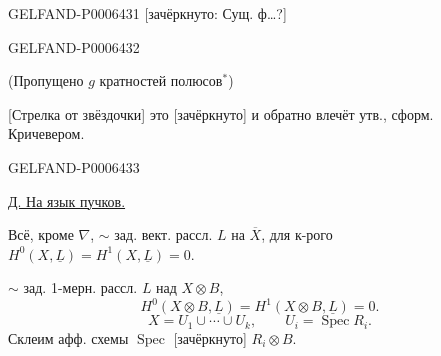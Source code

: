\begin{GelfandAdjacentEvidence}{GELFAND-P000643}{1}
[зачёркнуто: Сущ. ф…?]
\end{GelfandAdjacentEvidence}
\begin{GelfandAdjacentEvidence}{GELFAND-P000643}{2}

(Пропущено \(g\) кратностей полюсов\({}^*\))

[Стрелка от звёздочки] это [зачёркнуто] и обратно влечёт утв., сформ. Кричевером.
\end{GelfandAdjacentEvidence}
\begin{GelfandAdjacentEvidence}{GELFAND-P000643}{3}


\underline{Д. На язык пучков.}

Всё, кроме \(\nabla\), \(\sim\) зад. вект. рассл. \(L\) на \(\overline X\),
для к-рого \(H^0(X,\underline L)=H^1(X,\underline L)=0\).

\(\sim\) зад. 1-мерн. рассл. \(L\) над \(X\otimes B\),
\[
H^0(X\otimes B,\underline L)=H^1(X\otimes B,\underline L)=0.
\]
\[
X=U_1\cup\cdots\cup U_k,\qquad U_i=\operatorname{Spec}R_i.
\]
Склеим афф. схемы \(\operatorname{Spec}\) [зачёркнуто] \(R_i\otimes B\).
\end{GelfandAdjacentEvidence}
